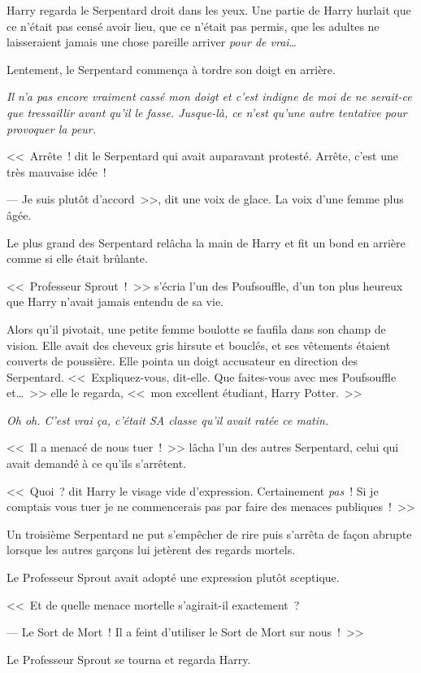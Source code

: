 Harry regarda le Serpentard droit dans les yeux. Une partie de Harry hurlait que ce n'était pas censé avoir lieu, que ce n'était pas permis, que les adultes ne laisseraient jamais une chose pareille arriver \emph{pour de vrai}…

Lentement, le Serpentard commença à tordre son doigt en arrière.

\emph{Il n'a pas encore vraiment cassé mon doigt et c'est indigne de moi de ne serait-ce que tressaillir avant qu'il le fasse. Jusque-là, ce n'est qu'une autre tentative pour provoquer la peur.}

<<~Arrête~! dit le Serpentard qui avait auparavant protesté. Arrête, c'est une très mauvaise idée~!

--- Je suis plutôt d'accord~>>, dit une voix de glace. La voix d'une femme plus âgée.

Le plus grand des Serpentard relâcha la main de Harry et fit un bond en arrière comme si elle était brûlante.

<<~Professeur Sprout~!~>> s'écria l'un des Poufsouffle, d'un ton plus heureux que Harry n'avait jamais entendu de sa vie.

Alors qu'il pivotait, une petite femme boulotte se faufila dans son champ de vision. Elle avait des cheveux gris hirsute et bouclés, et ses vêtements étaient couverts de poussière. Elle pointa un doigt accusateur en direction des Serpentard. <<~Expliquez-vous, dit-elle. Que faites-vous avec mes Poufsouffle et…~>> elle le regarda, <<~mon excellent étudiant, Harry Potter.~>>

\emph{Oh oh. C'est vrai ça, c'était SA classe qu'il avait ratée ce matin.}

<<~Il a menacé de nous tuer~!~>> lâcha l'un des autres Serpentard, celui qui avait demandé à ce qu'ils s'arrêtent.

<<~Quoi~? dit Harry le visage vide d'expression. Certainement \emph{pas}~! Si je comptais vous tuer je ne commencerais pas par faire des menaces publiques~!~>>

Un troisième Serpentard ne put s'empêcher de rire puis s'arrêta de façon abrupte lorsque les autres garçons lui jetèrent des regards mortels.

Le Professeur Sprout avait adopté une expression plutôt sceptique.

<<~Et de quelle menace mortelle s'agirait-il exactement~?

--- Le Sort de Mort~! Il a feint d'utiliser le Sort de Mort sur nous~!~>>

Le Professeur Sprout se tourna et regarda Harry.

